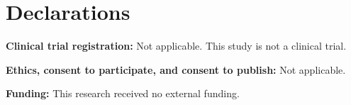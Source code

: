 \documentclass[pdflatex,sn-mathphys-num]{sn-jnl}%
\theoremstyle{thmstyleone}%
\theoremstyle{thmstyletwo}%
\theoremstyle{thmstylethree}%
\begin{document}

\maketitle






\section*{Declarations}

\textbf{Clinical trial registration:} Not applicable. This study is not a clinical trial.

\textbf{Ethics, consent to participate, and consent to publish:} Not applicable.

\textbf{Funding:} This research received no external funding.
\backmatter










\end{document}

